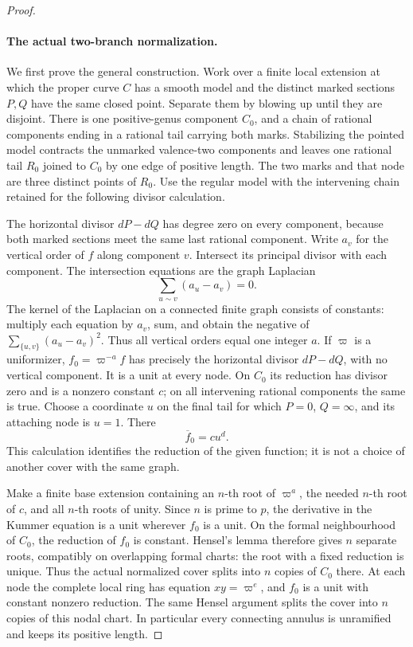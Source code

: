 \begin{proof}
\paragraph{The actual two-branch normalization.}
We first prove the general construction. Work over a finite
local extension at which the proper curve \(C\) has a
smooth model and the distinct marked sections \(P,Q\)
have the same closed point. Separate them by blowing up
until they are disjoint. There is one positive-genus
component \(C_0\), and a chain of rational components
ending in a rational tail carrying both marks. Stabilizing
the pointed model contracts the unmarked valence-two
components and leaves one rational tail \(R_0\) joined
to \(C_0\) by one edge of positive length. The two
marks and that node are three distinct points of \(R_0\).
Use the regular model with the intervening chain retained
for the following divisor calculation.

The horizontal divisor \(dP-dQ\) has degree zero on
every component, because both marked sections meet the
same last rational component. Write \(a_v\) for the
vertical order of \(f\) along component \(v\).
Intersect its principal divisor with each component.
The intersection equations are the graph Laplacian
\[
                       \sum_{u\sim v}(a_u-a_v)=0.
                                                               \tag{A.43.3}
\]
The kernel of the Laplacian on a connected finite graph
consists of constants: multiply each equation by \(a_v\),
sum, and obtain the negative of
\(\sum_{\{u,v\}}(a_u-a_v)^2\). Thus all vertical
orders equal one integer \(a\). If \(\varpi\) is a
uniformizer, \(f_0=\varpi^{-a}f\) has precisely the
horizontal divisor \(dP-dQ\), with no vertical component.
It is a unit at every node. On \(C_0\) its reduction
has divisor zero and is a nonzero constant \(c\); on
all intervening rational components the same is true.
Choose a coordinate \(u\) on the final tail for which
\(P=0\), \(Q=\infty\), and its attaching node is
\(u=1\). There
\[
                         \overline f_0=c u^d.        \tag{A.43.4}
\]
This calculation identifies the reduction of the given
function; it is not a choice of another cover with the
same graph.

Make a finite base extension containing an \(n\)-th
root of \(\varpi^a\), the needed \(n\)-th root of
\(c\), and all \(n\)-th roots of unity. Since
\(n\) is prime to \(p\), the derivative in the
Kummer equation is a unit wherever \(f_0\) is a
unit. On the formal neighbourhood of \(C_0\), the
reduction of \(f_0\) is constant. Hensel's lemma
therefore gives \(n\) separate roots, compatibly
on overlapping formal charts: the root with a fixed
reduction is unique. Thus the actual normalized cover
splits into \(n\) copies of \(C_0\) there. At each
node the complete local ring has equation
\(xy=\varpi^e\), and \(f_0\) is a unit with
constant nonzero reduction. The same Hensel argument
splits the cover into \(n\) copies of this nodal
chart. In particular every connecting annulus is
unramified and keeps its positive length.


\end{proof}
